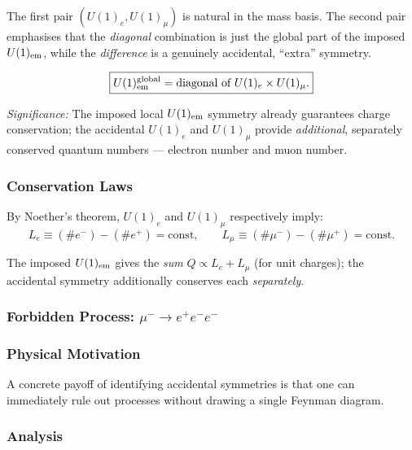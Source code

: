 \documentclass[../main.tex]{subfiles}
\begin{document}
\medskip
The first pair $(U(1)_e, U(1)_\mu)$ is natural in the mass basis.  The second pair emphasises that the \emph{diagonal} combination is just the global part of the imposed $U(1)_{\rm em}$, while the \emph{difference} is a genuinely accidental, ``extra'' symmetry.

\begin{equation}
  \boxed{
  U(1)_{\rm em}^{\rm global} = \text{diagonal of } U(1)_e \times U(1)_\mu.}
  \label{eq:lec12:diagonal}
\end{equation}

\textit{Significance:} The imposed local $U(1)_{\rm em}$ symmetry already guarantees charge conservation; the accidental $U(1)_e$ and $U(1)_\mu$ provide \emph{additional}, separately conserved quantum numbers — electron number and muon number.

\subsubsection*{Conservation Laws}

By Noether's theorem, $U(1)_e$ and $U(1)_\mu$ respectively imply:
\begin{equation}
  \boxed{
  L_e \equiv (\#e^-) - (\#e^+) = \text{const},
  \qquad
  L_\mu \equiv (\#\mu^-) - (\#\mu^+) = \text{const}.}
  \label{eq:lec12:lnum}
\end{equation}

The imposed $U(1)_{\rm em}$ gives the \emph{sum} $Q\propto L_e + L_\mu$ (for unit charges); the accidental symmetry additionally conserves each \emph{separately}.

\subsubsection*{Forbidden Process: $\mu^-\to e^+e^-e^-$}

\subsubsection*{Physical Motivation}

A concrete payoff of identifying accidental symmetries is that one can immediately rule out processes without drawing a single Feynman diagram.

\subsubsection*{Analysis}
\end{document}

